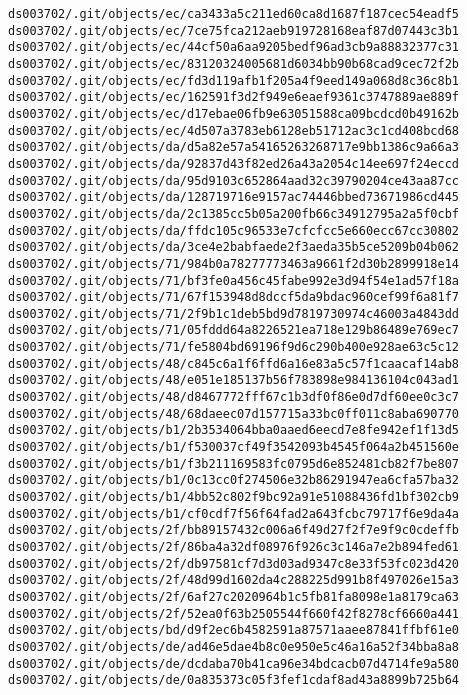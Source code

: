 \documentclass[11pt]{article}
\begin{document}
\begin{Verbatim}[commandchars=\\\{\}]
ds003702/.git/objects/ec/ca3433a5c211ed60ca8d1687f187cec54eadf5
ds003702/.git/objects/ec/7ce75fca212aeb919728168eaf87d07443c3b1
ds003702/.git/objects/ec/44cf50a6aa9205bedf96ad3cb9a88832377c31
ds003702/.git/objects/ec/83120324005681d6034bb90b68cad9cec72f2b
ds003702/.git/objects/ec/fd3d119afb1f205a4f9eed149a068d8c36c8b1
ds003702/.git/objects/ec/162591f3d2f949e6eaef9361c3747889ae889f
ds003702/.git/objects/ec/d17ebae06fb9e63051588ca09bcdcd0b49162b
ds003702/.git/objects/ec/4d507a3783eb6128eb51712ac3c1cd408bcd68
ds003702/.git/objects/da/d5a82e57a54165263268717e9bb1386c9a66a3
ds003702/.git/objects/da/92837d43f82ed26a43a2054c14ee697f24eccd
ds003702/.git/objects/da/95d9103c652864aad32c39790204ce43aa87cc
ds003702/.git/objects/da/128719716e9157ac74446bbed73671986cd445
ds003702/.git/objects/da/2c1385cc5b05a200fb66c34912795a2a5f0cbf
ds003702/.git/objects/da/ffdc105c96533e7cfcfcc5e660ecc67cc30802
ds003702/.git/objects/da/3ce4e2babfaede2f3aeda35b5ce5209b04b062
ds003702/.git/objects/71/984b0a78277773463a9661f2d30b2899918e14
ds003702/.git/objects/71/bf3fe0a456c45fabe992e3d94f54e1ad57f18a
ds003702/.git/objects/71/67f153948d8dccf5da9bdac960cef99f6a81f7
ds003702/.git/objects/71/2f9b1c1deb5bd9d7819730974c46003a4843dd
ds003702/.git/objects/71/05fddd64a8226521ea718e129b86489e769ec7
ds003702/.git/objects/71/fe5804bd69196f9d6c290b400e928ae63c5c12
ds003702/.git/objects/48/c845c6a1f6ffd6a16e83a5c57f1caacaf14ab8
ds003702/.git/objects/48/e051e185137b56f783898e984136104c043ad1
ds003702/.git/objects/48/d8467772fff67c1b3df0f86e0d7df60ee0c3c7
ds003702/.git/objects/48/68daeec07d157715a33bc0ff011c8aba690770
ds003702/.git/objects/b1/2b3534064bba0aaed6eecd7e8fe942ef1f13d5
ds003702/.git/objects/b1/f530037cf49f3542093b4545f064a2b451560e
ds003702/.git/objects/b1/f3b211169583fc0795d6e852481cb82f7be807
ds003702/.git/objects/b1/0c13cc0f274506e32b86291947ea6cfa57ba32
ds003702/.git/objects/b1/4bb52c802f9bc92a91e51088436fd1bf302cb9
ds003702/.git/objects/b1/cf0cdf7f56f64fad2a643fcbc79717f6e9da4a
ds003702/.git/objects/2f/bb89157432c006a6f49d27f2f7e9f9c0cdeffb
ds003702/.git/objects/2f/86ba4a32df08976f926c3c146a7e2b894fed61
ds003702/.git/objects/2f/db97581cf7d3d03ad9347c8e33f53fc023d420
ds003702/.git/objects/2f/48d99d1602da4c288225d991b8f497026e15a3
ds003702/.git/objects/2f/6af27c2020964b1c5fb81fa8098e1a8179ca63
ds003702/.git/objects/2f/52ea0f63b2505544f660f42f8278cf6660a441
ds003702/.git/objects/bd/d9f2ec6b4582591a87571aaee87841ffbf61e0
ds003702/.git/objects/de/ad46e5dae4b8c0e950e5c46a16a52f34bba8a8
ds003702/.git/objects/de/dcdaba70b41ca96e34bdcacb07d4714fe9a580
ds003702/.git/objects/de/0a835373c05f3fef1cdaf8ad43a8899b725b64

\end{Verbatim}
\end{document}
